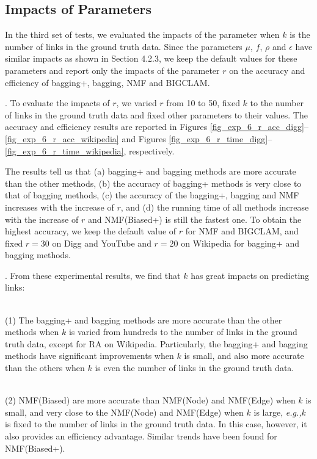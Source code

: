 \documentclass[10pt,journal,compsoc]{IEEEtran}
\newcommand{\stitle}[1]{\vspace{0.5ex}\noindent{\bf #1}}
\newcommand{\NMF}{{\sf NMF}\xspace }
\newcommand{\Node}{{\sf NMF(Node)}\xspace}
\newcommand{\Edge}{{\sf NMF(Edge)}\xspace}
\newcommand{\Biased}{{\sf NMF(Biased)}\xspace}
\newcommand{\RA}{{\sf RA}\xspace }
\newcommand{\BIGCLAM}{{\sf BIGCLAM}\xspace}
\newcommand{\Digg}{{\sf Digg}\xspace}
\newcommand{\YouTube}{{\sf YouTube}\xspace}
\newcommand{\Wikipedia}{{\sf Wikipedia}\xspace}
\newcommand{\Biasedp}{{\sf NMF(Biased+)}\xspace}
\newcommand{\eg}{\emph{e.g.,}\xspace}
\newcommand{\sstab}{\rule{0pt}{8pt}\\[-2.4ex]}
\begin{document}
\subsection{Impacts of Parameters}
In the third set of tests, we evaluated the impacts of the parameter when $k$
is the number of links in the ground truth data.
Since the parameters $\mu$, $f$, $\rho$ and $\epsilon$ have similar impacts as
shown in Section 4.2.3, we keep the default values for these parameters and
report only the impacts of the parameter $r$ on
the accuracy and  efficiency  of bagging+, bagging, \NMF and \BIGCLAM.

\stitle{Exp-6: Impacts of $r$}. To evaluate the impacts of $r$, we varied
$r$ from 10 to 50, fixed $k$ to the number of links in the ground truth data
and fixed other parameters to their values. The accuracy and  efficiency  results
are reported in Figures \ref{fig_exp_6_r_acc_digg}--\ref{fig_exp_6_r_acc_wikipedia}
and Figures \ref{fig_exp_6_r_time_digg}--\ref{fig_exp_6_r_time_wikipedia}, respectively.

The results tell us that (a) bagging+ and bagging methods are more accurate than
the other methods, (b) the accuracy of bagging+ methods is very close to that of bagging methods,
(c) the accuracy of the bagging+, bagging and \NMF increases with the increase of $r$,
and (d) the running time of all methods increase with the increase of $r$ and \Biasedp
is still the fastest one. To obtain the highest accuracy, we keep the default value of
$r$ for \NMF and \BIGCLAM, and fixed $r = 30$ on \Digg and \YouTube and $r = 20$ on
\Wikipedia for bagging+ and bagging methods.

\stitle{Remarks}. From these experimental results, we find that $k$ has great
impacts on predicting links:

\sstab (1) The bagging+ and bagging methods are more accurate than the other
methods when $k$ is varied from hundreds to the number of links in the ground
truth data, except for \RA on \Wikipedia. Particularly, the bagging+ and bagging
methods have significant improvements when $k$ is small, and also more accurate than
the others when $k$ is even the number of links in the ground truth data.

\sstab (2) \Biased are more accurate than \Node and \Edge when $k$ is small, and
very close to the \Node and \Edge when $k$ is large, \eg $k$ is fixed to the
number of links in the ground truth data. In this case, however, it also provides an efficiency
advantage. Similar trends have been found for \Biasedp.
\end{document}
